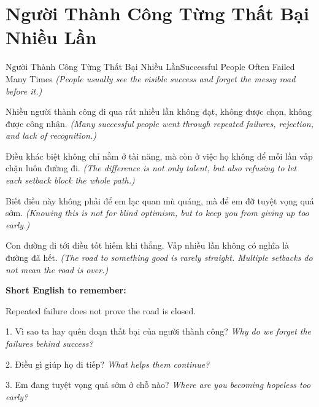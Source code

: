 \section{Người Thành Công Từng Thất Bại Nhiều Lần}
\begin{truyen}{Người Thành Công Từng Thất Bại Nhiều Lần}{Successful People Often Failed Many Times}
\textit{(People usually see the visible success and forget the messy road before it.)}

Nhiều người thành công đi qua rất nhiều lần không đạt, không được chọn, không được công nhận.
\textit{(Many successful people went through repeated failures, rejection, and lack of recognition.)}

Điều khác biệt không chỉ nằm ở tài năng, mà còn ở việc họ không để mỗi lần vấp chặn luôn đường đi.
\textit{(The difference is not only talent, but also refusing to let each setback block the whole path.)}

Biết điều này không phải để em lạc quan mù quáng, mà để em đỡ tuyệt vọng quá sớm.
\textit{(Knowing this is not for blind optimism, but to keep you from giving up too early.)}
\end{truyen}

\begin{baihoc}
Con đường đi tới điều tốt hiếm khi thẳng. Vấp nhiều lần không có nghĩa là đường đã hết.
\textit{(The road to something good is rarely straight. Multiple setbacks do not mean the road is over.)}
\end{baihoc}

\begin{ghinhoanh}
\textbf{Short English to remember:}

Repeated failure does not prove the road is closed.

\end{ghinhoanh}

\begin{tuhocnhanh}
1. Vì sao ta hay quên đoạn thất bại của người thành công? \textit{Why do we forget the failures behind success?}

2. Điều gì giúp họ đi tiếp? \textit{What helps them continue?}

3. Em đang tuyệt vọng quá sớm ở chỗ nào? \textit{Where are you becoming hopeless too early?}
\end{tuhocnhanh}
\ngancach

